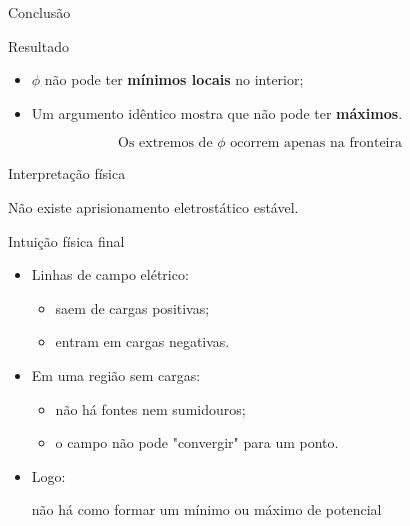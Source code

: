\documentclass[aspectratio=169,11pt]{beamer}
\begin{document}
\begin{frame}{Conclusão}
\begin{block}{Resultado}
\begin{itemize}
\item $\phi$ não pode ter \textbf{mínimos locais} no interior;
\item Um argumento idêntico mostra que não pode ter \textbf{máximos}.
\end{itemize}
\end{block}

\pause

\begin{equation}
\boxed{
\text{Os extremos de } \phi \text{ ocorrem apenas na fronteira}
}
\end{equation}

\pause

\begin{alertblock}{Interpretação física}
\begin{center}
Não existe aprisionamento eletrostático estável.
\end{center}
\end{alertblock}
\end{frame}

\begin{frame}{Intuição física final}
\begin{itemize}
\item Linhas de campo elétrico:
\begin{itemize}
\item saem de cargas positivas;
\item entram em cargas negativas.
\end{itemize}

\pause

\item Em uma região sem cargas:
\begin{itemize}
\item não há fontes nem sumidouros;
\item o campo não pode "convergir" para um ponto.
\end{itemize}

\pause

\item Logo:
\begin{center}
não há como formar um mínimo ou máximo de potencial
\end{center}
\end{itemize}
\end{frame}
\end{document}
